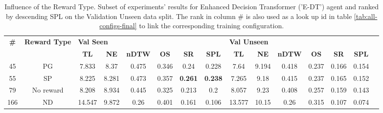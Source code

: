 \begin{table}
\centering
\caption{\label{tab:e_dt_reward_type}Influence of the Reward Type. Subset of experiments' results for Enhanced Decision Transformer ('E-DT') agent and ranked by descending SPL on the Validation Unseen data split. The rank in column \# is also used as a look up id in table \ref{tab:all-configs-final} to link the corresponding training configuration.}
\begin{tabular}{@{\hskip3pt}c@{\hskip3pt}c@{\hskip3pt}c@{\hskip3pt}c@{\hskip3pt}c@{\hskip3pt}c@{\hskip3pt}c@{\hskip3pt}c@{\hskip3pt}c@{\hskip3pt}c@{\hskip3pt}c@{\hskip3pt}c@{\hskip3pt}c@{\hskip3pt}c@{\hskip3pt}c}
\toprule
\textbf{\#} & \textbf{Reward Type} & \multicolumn{6}{l}{\textbf{Val Seen}} & \multicolumn{6}{l}{\textbf{Val Unseen}} \\
 \textbf{~} &           \textbf{~} &       \textbf{TL} & \textbf{NE} & \textbf{nDTW} & \textbf{OS} &     \textbf{SR} &    \textbf{SPL} &         \textbf{TL} & \textbf{NE} & \textbf{nDTW} & \textbf{OS} & \textbf{SR} & \textbf{SPL} \\
\midrule
         45 &                   PG &             7.833 &        8.37 &         0.475 &       0.346 &            0.24 &           0.228 &                7.64 &       9.194 &         0.418 &       0.237 &       0.166 &        0.154 \\
         55 &                   SP &             8.225 &       8.281 &         0.473 &       0.357 &  \textbf{0.261} &  \textbf{0.238} &               7.265 &        9.18 &         0.415 &       0.237 &       0.165 &        0.152 \\
         79 &            No reward &             8.208 &       8.934 &         0.445 &       0.325 &           0.213 &             0.2 &               8.057 &        9.23 &         0.408 &       0.257 &       0.159 &        0.143 \\
        166 &                   ND &            14.547 &       9.872 &          0.26 &       0.401 &           0.161 &           0.106 &              13.577 &       10.15 &          0.26 &       0.315 &       0.107 &        0.074 \\
\bottomrule
\end{tabular}
\end{table}
